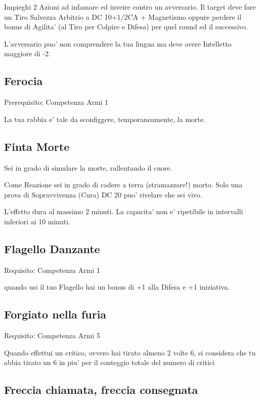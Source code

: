 \documentclass[a4paper,11pt,twoside,openany]{dndbook}
\begin{document}
Impieghi 2 Azioni ad infamare ed inveire contro un avversario. Il target deve fare un Tiro Salvezza Arbitrio a DC 10+1/2CA + Magnetismo oppure perdere il bonus di Agilita' (al Tiro per Colpire e Difesa) per quel round ed il successivo.

L'avversario puo' non comprendere la tua lingua ma deve avere Intelletto maggiore di -2.

\subsection{Ferocia}

Prerequisito; Competenza Armi 1

La tua rabbia e' tale da sconfiggere, temporaneamente, la morte.

\subsection{Finta Morte}

Sei in grado di simulare la morte, rallentando il cuore.

Come Reazione sei in grado di cadere a terra (stramazzare!) morto. Solo una prova di Sopravvivenza (Cura) DC 20 puo' rivelare che sei vivo.

L'effetto dura al massimo 2 minuti. La capacita' non e' ripetibile in intervalli inferiori ai 10 minuti.

\subsection{Flagello Danzante}

Requisito: Competenza Armi 1

quando usi il tuo Flagello hai un bonus di +1 alla Difesa e +1 iniziativa.

\subsection{Forgiato nella furia}

Requisito: Competenza Armi 5

Quando effettui un critico, ovvero hai tirato almeno 2 volte 6, si considera che tu abbia tirato un 6 in piu' per il conteggio totale del numero di critici

\subsection{Freccia chiamata, freccia consegnata}
\end{document}
